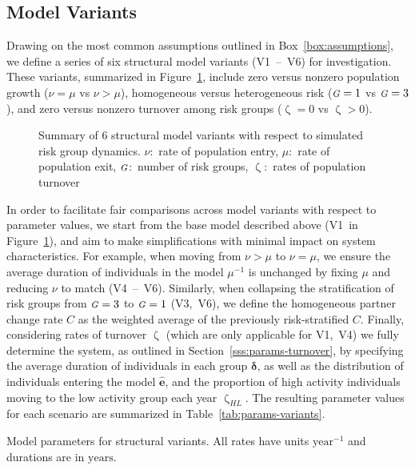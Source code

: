 \documentclass[10pt]{article}
\numberwithin{equation}{section}
\renewcommand{\zeta}{\upzeta}
\newcommand{\G}{{\mbox{\footnotesize{\textit{G}}}}}
\newcommand{\fig}[1]{Figure~\ref{#1}}
\newcommand{\tab}[1]{Table~\ref{#1}}
\begin{document}
\subsection{Model Variants}\label{ss:exp-variants}
Drawing on the most common assumptions outlined in Box~\ref{box:assumptions},
we define a series of six structural model variants (V1~--~V6) for investigation.
These variants, summarized in \fig{fig:variant-tree}, include
zero versus nonzero population growth ($\nu = \mu$ vs $\nu > \mu$),
homogeneous versus heterogeneous risk ($\G = 1$ vs $\G = 3$),
and zero versus nonzero turnover among risk groups ($\zeta = 0$ vs $\zeta > 0$).
\begin{figure}
  \centering
  \caption{Summary of 6 structural model variants with respect to simulated risk group dynamics.
    $\nu$:~rate of population entry,
    $\mu$:~rate of population exit,
    $\G$:~number of risk groups,
    $\zeta$:~rates of population turnover}
  \label{fig:variant-tree}
\end{figure}
\par
In order to facilitate fair comparisons across model variants with respect to parameter values,
we start from the base model described above (V1~in \fig{fig:variant-tree}),
and aim to make simplifications with minimal impact on system characteristics.
For example, when moving from $\nu > \mu$ to $\nu = \mu$,
we ensure the average duration of individuals in the model $\mu^{-1}$ is unchanged
by fixing $\mu$ and reducing $\nu$ to match (V4~--~V6).
Similarly, when collapsing the stratification of risk groups from $\G = 3$ to $\G = 1$ (V3,~V6),
we define the homogeneous partner change rate $C$
as the weighted average of the previously risk-stratified $C$.
Finally, considering rates of turnover $\zeta$
(which are only applicable for V1,~V4)
we fully determine the system, as outlined in Section~\ref{sss:params-turnover},
by specifying the average duration of individuals in each group $\bm{\delta}$,
as well as the distribution of individuals entering the model $\bm{\hat{e}}$,
and the proportion of high activity individuals moving to the low activity group each year $\zeta_{HL}$.
The resulting parameter values for each scenario
are summarized in \tab{tab:params-variants}.
\begin{table}
  \centering\caption{Model parameters for structural variants.
    All rates have units $\mathrm{year}^{-1}$ and durations are in $\mathrm{years}$.}
  \label{tab:params-variants}
  
\end{table}
\end{document}
